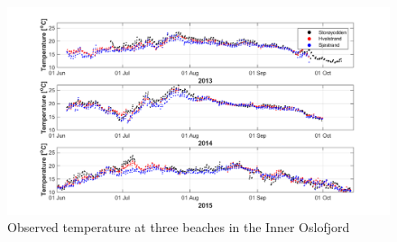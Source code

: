 \begin{figure}[ht]
\centerline{
\includegraphics*[trim=2cm 0 2cm 0cm,clip=true,width=\textwidth]{Figurer/badetemp}
}
\caption{\small
Observed temperature at three beaches in the Inner Oslofjord}
\label{fig:temp_strand}
\end{figure}



